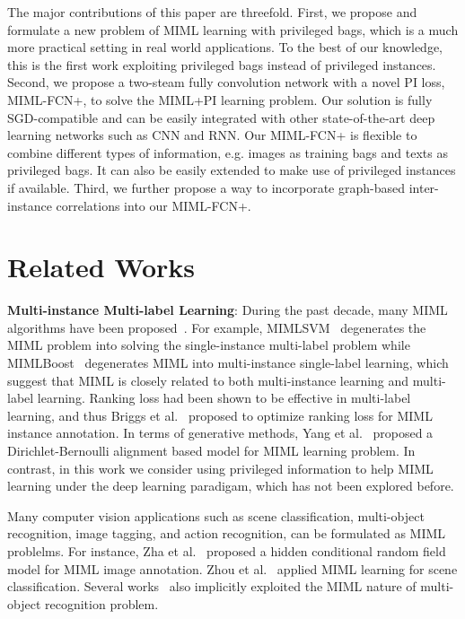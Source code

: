 \documentclass[10pt,twocolumn,letterpaper]{article}
\begin{document}
The major contributions of this paper are threefold. First, we
propose and formulate a new problem of MIML learning with
privileged bags, which is a much more practical setting in real
world applications. To the best of our knowledge, this is the
first work exploiting privileged bags instead of privileged
instances. Second, we propose a two-steam fully convolution
network with a novel PI loss, MIML-FCN+, to solve the MIML+PI
learning problem. Our solution is fully SGD-compatible and can be
easily integrated with other state-of-the-art deep learning
networks such as CNN and RNN. Our MIML-FCN+ is flexible to combine
different types of information, e.g. images as training bags and
texts as privileged bags. It can also be easily extended to make
use of privileged instances if available. Third, we further
propose a way to incorporate graph-based inter-instance
correlations into our MIML-FCN+.


\section{Related Works}
\textbf{Multi-instance Multi-label Learning}: During the past
decade, many MIML algorithms have been
proposed~\cite{Luo2010,Zhou2006,Zhou2012,Nguyen2010,Nguyen2013}.
For example, MIMLSVM~\cite{Zhou2006} degenerates the MIML problem
into solving the single-instance multi-label problem while
MIMLBoost~\cite{Zhou2006} degenerates MIML into multi-instance
single-label learning, which suggest that MIML is closely related
to both multi-instance learning and multi-label learning. Ranking
loss had been shown to be effective in multi-label learning, and
thus Briggs et al.~\cite{Briggs2012} proposed to optimize ranking
loss for MIML instance annotation. In terms of generative methods,
Yang et al.~\cite{Yang2009} proposed a Dirichlet-Bernoulli
alignment based model for MIML learning problem. In contrast, in
this work we consider using privileged information to help MIML
learning under the deep learning paradigam, which has not been
explored before.

Many computer vision applications such as scene classification,
multi-object recognition, image tagging, and action recognition,
can be formulated as MIML problelms. For instance, Zha et
al.~\cite{Zha2008} proposed a hidden conditional random field
model for MIML image annotation. Zhou et al.~\cite{Zhou2006}
applied MIML learning for scene classification. Several
works~\cite{Oquab2014,Yang2016a,Bilen2016} also implicitly
exploited the MIML nature of multi-object recognition problem.
\end{document}
